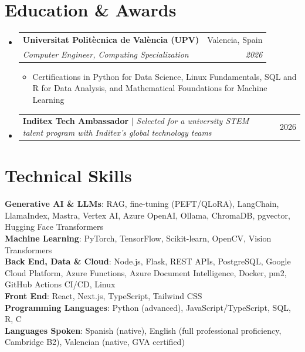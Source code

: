\documentclass[letterpaper,10pt]{article}
\makeatletter
\newcommand{\resumeItem}[1]{
  \item\small{
    {#1 \vspace{-2pt}}
  }
}
\newcommand{\resumeSubheading}[4]{
  \vspace{-2pt}\item
    \begin{tabular*}{0.97\textwidth}[t]{l@{\extracolsep{\fill}}r}
      \textbf{#1} & #2 \\
      \textit{\small#3} & \textit{\small #4} \\
    \end{tabular*}\vspace{-7pt}
}
\newcommand{\resumeProjectHeading}[2]{
    \item
    \begin{tabular*}{0.97\textwidth}{l@{\extracolsep{\fill}}r}
      \small#1 & #2 \\
    \end{tabular*}\vspace{-7pt}
}
\newcommand{\resumeSubHeadingListStart}{\begin{itemize}[leftmargin=0.15in, label={}]}
\newcommand{\resumeSubHeadingListEnd}{\end{itemize}}
\newcommand{\resumeItemListStart}{\begin{itemize}[leftmargin=0.18in]}
\newcommand{\resumeItemListEnd}{\end{itemize}\vspace{-5pt}}
\makeatother
\begin{document}
\section{Education \& Awards}
  \resumeSubHeadingListStart
    \resumeSubheading
      {Universitat Polit\`ecnica de Val\`encia (UPV)}{Valencia, Spain}
      {Computer Engineer, Computing Specialization}{2026}
      \resumeItemListStart
        \resumeItem{Certifications in Python for Data Science, Linux Fundamentals, SQL and R for Data Analysis, and Mathematical Foundations for Machine Learning}
      \resumeItemListEnd
    \resumeProjectHeading
      {\textbf{Inditex Tech Ambassador} $|$ \emph{Selected for a university STEM talent program with Inditex's global technology teams}}{2026}
  \resumeSubHeadingListEnd

\section{Technical Skills}
 \begin{itemize}[leftmargin=0.15in, label={}]
    \small{\item{
     \textbf{Generative AI \& LLMs}{: RAG, fine-tuning (PEFT/QLoRA), LangChain, LlamaIndex, Mastra, Vertex AI, Azure OpenAI, Ollama, ChromaDB, pgvector, Hugging Face Transformers} \\
     \textbf{Machine Learning}{: PyTorch, TensorFlow, Scikit-learn, OpenCV, Vision Transformers} \\
     \textbf{Back End, Data \& Cloud}{: Node.js, Flask, REST APIs, PostgreSQL, Google Cloud Platform, Azure Functions, Azure Document Intelligence, Docker, pm2, GitHub Actions CI/CD, Linux} \\
     \textbf{Front End}{: React, Next.js, TypeScript, Tailwind CSS} \\
     \textbf{Programming Languages}{: Python (advanced), JavaScript/TypeScript, SQL, R, C} \\
     \textbf{Languages Spoken}{: Spanish (native), English (full professional proficiency, Cambridge B2), Valencian (native, GVA certified)}
    }}
 \end{itemize}

\end{document}
